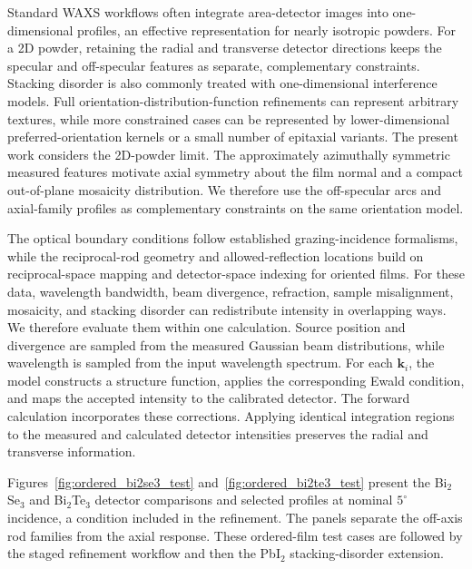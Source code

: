 Standard WAXS workflows often integrate area-detector images into one-dimensional profiles, an effective representation for nearly isotropic powders.\cite{Ashiotis2015,Hexemer2015,Savikhin2020,Reus2024} For a 2D powder, retaining the radial and transverse detector directions keeps the specular and off-specular features as separate, complementary constraints. Stacking disorder is also commonly treated with one-dimensional interference models.\cite{HendricksTeller1942,Treacy1991,CasasCabanas2016} Full orientation-distribution-function refinements can represent arbitrary textures,\cite{WenkVanHoutte2004,Lutterotti2004TSF,VonDreele1997,LutterottiVasinWenk2014} while more constrained cases can be represented by lower-dimensional preferred-orientation kernels\cite{March1932,Dollase1986} or a small number of epitaxial variants.\cite{Smilgies2000POPOP} The present work considers the 2D-powder limit. The approximately azimuthally symmetric measured features motivate axial symmetry about the film normal and a compact out-of-plane mosaicity distribution. We therefore use the off-specular arcs and axial-family profiles as complementary constraints on the same orientation model.

The optical boundary conditions follow established grazing-incidence formalisms,\cite{Sinha1988,Renaud2009,Hexemer2015,Savikhin2020} while the reciprocal-rod geometry and allowed-reflection locations build on reciprocal-space mapping and detector-space indexing for oriented films.\cite{SmilgiesBlasini2007,Smilgies2005Rods,Breiby2008,SmilgiesLi2026IndexGIXS} For these data, wavelength bandwidth, beam divergence, refraction, sample misalignment, mosaicity, and stacking disorder can redistribute intensity in overlapping ways. We therefore evaluate them within one calculation.
Source position and divergence are sampled from the measured Gaussian beam distributions, while wavelength is sampled from the input wavelength spectrum. For each $\mathbf{k}_i$, the model constructs a structure function, applies the corresponding Ewald condition, and maps the accepted intensity to the calibrated detector. The forward calculation incorporates these corrections. Applying identical integration regions to the measured and calculated detector intensities preserves the radial and transverse information.

Figures~\ref{fig:ordered_bi2se3_test} and~\ref{fig:ordered_bi2te3_test} present the Bi$_2$Se$_3$ and Bi$_2$Te$_3$ detector comparisons and selected profiles at nominal $5^\circ$ incidence, a condition included in the refinement. The panels separate the off-axis rod families from the axial response. These ordered-film test cases are followed by the staged refinement workflow and then the PbI$_2$ stacking-disorder extension.
